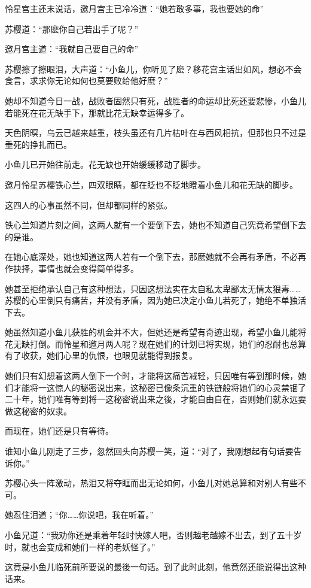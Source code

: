 \documentclass[12pt,oneside]{book}
\begin{document}
怜星宫主还末说话，邀月宫主已冷冷道：``她若敢多事，我也要她的命''

苏樱道：``那麽你自己若出手了呢？''

邀月宫主道：``我就自己要自己的命''

苏樱擦了擦眼泪，大声道：``小鱼儿，你听见了麽？移花宫主话出如风，想必不会食言，求求你无论如何也莫要败给他好麽？''

她却不知道今日一战，战败者固然只有死，战胜者的命运却比死还要悲惨，小鱼儿若能死在花无缺手下，那就比花无缺幸运得多了。

天色阴暝，乌云已越来越重，枝头虽还有几片枯叶在与西风相抗，但那也只不过是垂死的挣扎而已。

小鱼儿已开始往前走。花无缺也开始缓缓移动了脚步。

邀月怜星苏樱铁心兰，四双眼睛，都在眨也不眨地瞪着小鱼儿和花无缺的脚步。

这四人的心事虽然不同，但却都同样的紧张。

铁心兰知道片刻之间，这两人就有一个要倒下去，她也不知道自己究竟希望倒下去的是谁。

在她心底深处，她也知道这两人若有一个倒下去，那麽她就不会再有矛盾，不必再作抉择，事情也就会变得简单得多。

她甚至拒绝承认自己有这种想法，只因这想法实在太自私太卑鄙太无情太狠毒\ldots\ldots 苏樱的心里倒只有痛苦，并没有矛盾，因为她已决定小鱼儿若死了，她绝不单独活下去。

她虽然知道小鱼儿获胜的机会并不大，但她还是希望有奇迹出现，希望小鱼儿能将花无缺打倒。而怜星和邀月两人呢？现在她们的计划已将实现，她们的忍耐也总算有了收获，她们心里的仇恨，也眼见就能得到报复。

她们只有幻想着这两人倒下一个时，才能将这痛苦减轻，只因唯有等到那时候，她们才能将一这惊人的秘密说出来，这秘密已像条沉重的铁链般将她们的心灵禁锢了二十年，她们唯有等到将一这秘密说出来之後，才能自由自在，否则她们就永远要做这秘密的奴隶。

而现在，她们还是只有等待。

谁知小鱼儿刚走了三步，忽然回头向苏樱一笑，道：``对了，我刚想起有句话要告诉你。''

苏樱心头一阵激动，热泪又将夺眶而出无论如何，小鱼儿对她总算和对别人有些不可。

她忍住泪道；``你\ldots\ldots 你说吧，我在听着。''

小鱼兄道：``我劝你还是乘着年轻时快嫁人吧，否则越老越嫁不出去，到了五十岁时，就也会变成和她们一样的老妖怪了。''

这竟是小鱼儿临死前所要说的最後一句话。到了此时此刻，他竟然还能说得出这种话来。
\end{document}
